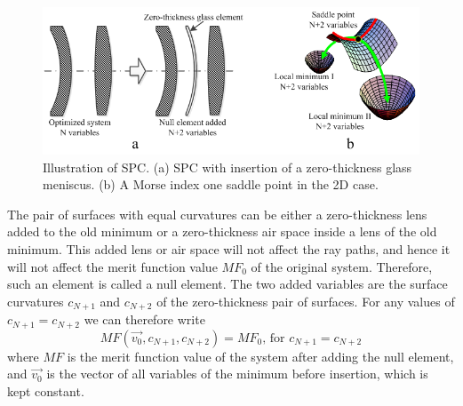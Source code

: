 \begin{figure}[h!]
    \centering
    \includegraphics[scale=0.68]{FigSPCDemo.png}
    \caption{Illustration of SPC. (a) SPC with insertion of a zero-thickness glass meniscus. (b) A Morse index one saddle point in the 2D case.}
    \label{fig:SPCdemo}
\end{figure}

The pair of surfaces with equal curvatures can be either a zero-thickness lens added to the old minimum or a zero-thickness air space inside a lens of the old minimum. This added lens or air space will not affect the ray paths, and hence it will not affect the merit function value $MF_0$ of the original system. Therefore, such an element is called a null element. The two added variables are the surface curvatures $c_{N+1}$ and $c_{N+2}$ of the zero-thickness pair of surfaces. For any values of $c_{N+1} = c_{N+2}$ we can therefore write
\begin{equation} \label{eq:1}
    MF(\vec{v_0},c_{N+1},c_{N+2}) = MF_0 \textrm{, for } c_{N+1}=c_{N+2} 
\end{equation} 
where $MF$ is the merit function value of the system after adding the null element, and $\vec{v_0}$ is the vector of all variables of the minimum before insertion, which is kept constant.

